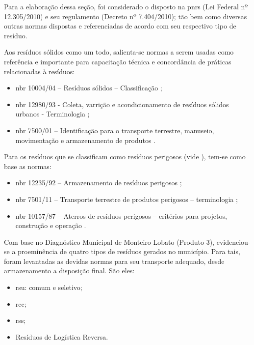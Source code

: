 Para a elaboração dessa seção, foi considerado o disposto na \gls{pnrs} (Lei Federal nº 12.305/2010) e seu regulamento (Decreto nº 7.404/2010); tão bem como diversas outras normas dispostas e referenciadas de acordo com seu respectivo tipo de resíduo.

Aos resíduos sólidos como um todo, salienta-se normas a serem usadas como referência e importante para capacitação técnica e concordância de práticas relacionadas à resíduos:

\begin{itemize}
	\item \gls{nbr} 10004/04 – Resíduos sólidos – Classificação \cite{abnt:10004:2004};
	\item \gls{nbr} 12980/93 - Coleta, varrição e acondicionamento de resíduos sólidos urbanos - Terminologia \cite{abnt:12980:1993};
	\item \gls{nbr} 7500/01 – Identificação para o transporte terrestre, manuseio, movimentação e armazenamento de produtos \cite{abnt:7500:2001}.
\end{itemize}

Para os resíduos que se classificam como resíduos perigosos (vide \cite{abnt:10004:2004}), tem-se como base as normas:

\begin{itemize}
	\item \gls{nbr} 12235/92 – Armazenamento de resíduos perigosos \cite{abnt:12235:1992};
	\item \gls{nbr} 7501/11 – Transporte terrestre de produtos perigosos – terminologia \cite{abnt:7501:2011}; 
	\item \gls{nbr} 10157/87 – Aterros de resíduos perigosos – critérios para projetos, construção e operação \cite{abnt:10157:1987}.
\end{itemize}

Com base no Diagnóstico Municipal de Monteiro Lobato (Produto 3), evidenciou-se a proeminência de quatro tipos de resíduos gerados no município. Para tais, foram levantadas as devidas normas para seu transporte adequado, desde armazenamento a disposição final. São eles:

\begin{itemize}
	\item \gls{rsu}: comum e seletivo;
	\item \gls{rcc};
	\item \gls{rss};
	\item Resíduos de Logística Reversa.
\end{itemize}

